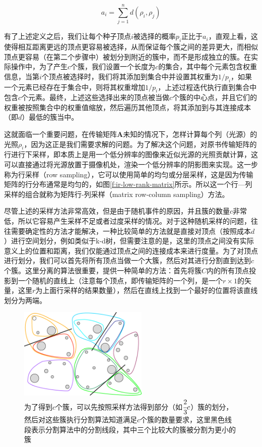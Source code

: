 \begin{equation}
	a_i=\sum^{n}_{j=1}d(\rho_i,\rho_j)
\end{equation}

\noindent 有了上述定义之后，我们让每个种子顶点$i$被选择的概率$p_i$正比于$a_i$，直观上看，这使得相互距离更远的顶点更容易被选择，从而保证每个簇之间的差异更大，而相似顶点更容易（在第二个步骤中）被划分到附近的簇中，而不是形成独立的簇。在实际操作中，为了产生$c$个簇，我们设置一个长度为$c$的集合，其中每个元素包含权重信息，当第$i$个顶点被选择时，我们将其添加到集合中并设置其权重为$1/p_i$，如果一个元素已经存在于集合中，则将其权重增加$1/p_i$，上述过程迭代执行直到集合中包含$c$个元素。最终，上述这些选择出来的顶点被当做$c$个簇的中心点，并且它们的权重被按照集合中的权重值缩放，然后遍历其他顶点，将其添加到与其连接成本（即$d$）最低的簇当中。

这就面临一个重要问题，在传输矩阵$\mathbf{A}$未知的情况下，怎样计算每个列（光源）的光照$\rho_i$，因为这正是我们需要求解的问题。为了解决这个问题，\cite{a:MatrixRow-ColumnSamplingfortheMany-LightProblem}对原书传输矩阵的行进行下采样，即本质上是用一个低分辨率的图像来近似光源的光照贡献计算，这可以直接通过将光源放置于摄像机处，渲染一个低分辨率的阴影图来实现。这一步称为行采样（row sampling），它可以使用简单的均匀或分层采样，这是因为传输矩阵的行分布通常是均匀的，如图\ref{f:ir-low-rank-matrix}所示。所以这一个行—列采样的组合就称为矩阵行-列采样（matrix row-column sampling）方法。

尽管上述的采样方法非常高效，但是由于随机事件的原因，并且簇的数量$c$非常低，所以它容易产生采样不足或者过度采样的情况。对于这种随机采样的问题，往往需要确定性的方法才能解决，一种比较简单的方法就是直接对顶点（按照成本$d$）进行空间划分，例如类似于k-d树，但需要注意的是，这里的顶点之间没有实际意义上的位置和距离，我们仅能通过顶点之间的连接成本来进行度量。为了对顶点进行划分，我们可以首先将所有顶点当做一个大簇，然后对其进行分割直到达到$c$个簇。这里分离的算法很重要，\cite{a:MatrixRow-ColumnSamplingfortheMany-LightProblem}提供一种简单的方法：首先将簇$C$内的所有顶点投影到一个随机的直线上（注意每个顶点，即传输矩阵的一个列，是一个$r\times 1$的矢量，这里$r$为上面行采样的结果数量），然后在直线上找到一个最好的位置将该直线划分为两端。

\begin{figure}
	\sidecaption
	\includegraphics[width=0.55\textwidth]{figures/ir/combine-clustering}
	\caption{为了得到$c$个簇，可以先按照采样方法得到部分（如$ \cfrac{2}{3}c$）簇的划分，然后对这些簇执行分割算法知道满足$c$个簇的数量要求，这里黑色线段表示分割算法中的分割线段，其中三个比较大的簇被分割为更小的簇}
	\label{f:ir-combine-clustering}
\end{figure}

